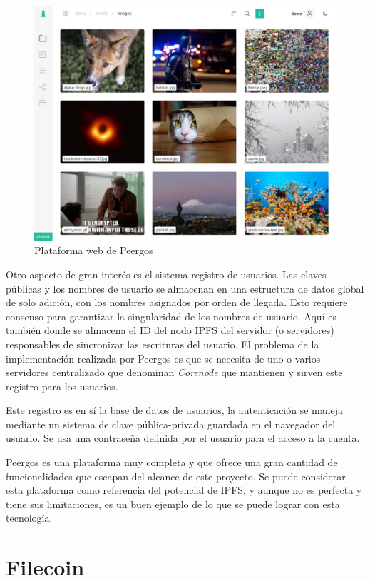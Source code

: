 \begin{figure}[H]
    \centering
    \small
    \includegraphics[width=0.8\linewidth]{images/peergos.jpg}
    \caption{Plataforma web de Peergos}
    \label{fig:peergos}
\end{figure}

Otro aspecto de gran interés es el sistema registro de usuarios. Las claves públicas y los nombres de usuario se almacenan en una estructura de datos global de solo adición,
con los  nombres asignados por orden de llegada. Esto requiere consenso para garantizar la singularidad de los nombres de usuario.
Aquí es también donde se almacena el ID del nodo IPFS del servidor (o servidores) responsables de sincronizar las escrituras del
usuario. El problema de la implementación realizada por Peergos es que se necesita de uno o varios servidores centralizado
que denominan \textit{Corenode} que mantienen y sirven este registro para los usuarios.

Este registro es en sí la base de datos de usuarios, la autenticación se maneja mediante un sistema de clave pública-privada
guardada en el navegador del usuario. Se usa una contraseña definida por el usuario para el acceso a la cuenta.

Peergos es una plataforma muy completa y que ofrece una gran cantidad de funcionalidades que escapan del alcance de este proyecto.
Se puede considerar esta plataforma como referencia del potencial de IPFS, y aunque no es perfecta y tiene sus limitaciones, es un buen ejemplo de lo que se puede lograr con esta tecnología.

\section{Filecoin}

